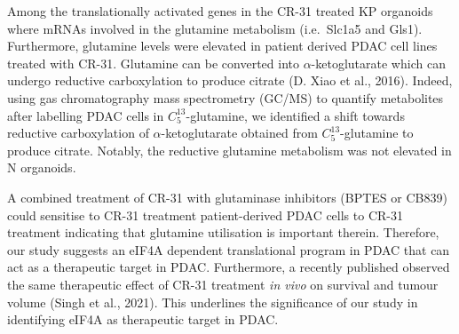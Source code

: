 \documentclass[
  12pt,
  openany]{book}
\begin{document}
Among the translationally activated genes in the CR-31 treated KP organoids where mRNAs involved in the glutamine metabolism (i.e.~Slc1a5 and Gls1). Furthermore, glutamine levels were elevated in patient derived PDAC cell lines treated with CR-31. Glutamine can be converted into \(\alpha\)-ketoglutarate which can undergo reductive carboxylation to produce citrate (D. Xiao et al., 2016). Indeed, using gas chromatography mass spectrometry (GC/MS) to quantify metabolites after labelling PDAC cells in \(C_5^{13}\)-glutamine, we identified a shift towards reductive carboxylation of \(\alpha\)-ketoglutarate obtained from \(C_5^{13}\)-glutamine to produce citrate. Notably, the reductive glutamine metabolism was not elevated in N organoids.

A combined treatment of CR-31 with glutaminase inhibitors (BPTES or CB839) could sensitise to CR-31 treatment patient-derived PDAC cells to CR-31 treatment indicating that glutamine utilisation is important therein. Therefore, our study suggests an eIF4A dependent translational program in PDAC that can act as a therapeutic target in PDAC. Furthermore, a recently published observed the same therapeutic effect of CR-31 treatment \emph{in vivo} on survival and tumour volume (Singh et al., 2021). This underlines the significance of our study in identifying eIF4A as therapeutic target in PDAC.
\end{document}
